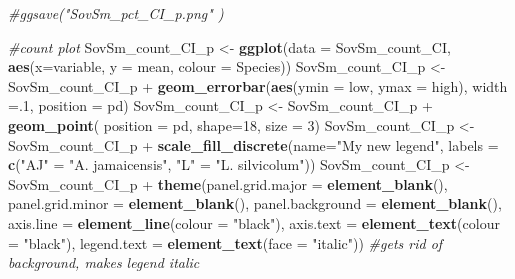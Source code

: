 \documentclass[]{article}
\newenvironment{Shaded}{\begin{snugshade}}{\end{snugshade}}
\newcommand{\KeywordTok}[1]{\textcolor[rgb]{0.13,0.29,0.53}{\textbf{{#1}}}}
\newcommand{\DataTypeTok}[1]{\textcolor[rgb]{0.13,0.29,0.53}{{#1}}}
\newcommand{\DecValTok}[1]{\textcolor[rgb]{0.00,0.00,0.81}{{#1}}}
\newcommand{\StringTok}[1]{\textcolor[rgb]{0.31,0.60,0.02}{{#1}}}
\newcommand{\CommentTok}[1]{\textcolor[rgb]{0.56,0.35,0.01}{\textit{{#1}}}}
\newcommand{\NormalTok}[1]{{#1}}
\begin{document}
\begin{Shaded}
\begin{Highlighting}[]
\CommentTok{#ggsave("SovSm_pct_CI_p.png" )}

\CommentTok{#count plot}
\NormalTok{SovSm_count_CI_p <-}\StringTok{ }\KeywordTok{ggplot}\NormalTok{(}\DataTypeTok{data =} \NormalTok{SovSm_count_CI, }\KeywordTok{aes}\NormalTok{(}\DataTypeTok{x=}\NormalTok{variable, }\DataTypeTok{y =} \NormalTok{mean, }\DataTypeTok{colour =} \NormalTok{Species))}
\NormalTok{SovSm_count_CI_p <-}\StringTok{ }\NormalTok{SovSm_count_CI_p +}\StringTok{ }\KeywordTok{geom_errorbar}\NormalTok{(}\KeywordTok{aes}\NormalTok{(}\DataTypeTok{ymin =} \NormalTok{low, }\DataTypeTok{ymax =} \NormalTok{high), }\DataTypeTok{width =}\NormalTok{.}\DecValTok{1}\NormalTok{, }\DataTypeTok{position =} \NormalTok{pd)}
\NormalTok{SovSm_count_CI_p <-}\StringTok{ }\NormalTok{SovSm_count_CI_p +}\StringTok{ }\KeywordTok{geom_point}\NormalTok{( }\DataTypeTok{position =} \NormalTok{pd, }\DataTypeTok{shape=}\DecValTok{18}\NormalTok{, }\DataTypeTok{size =} \DecValTok{3}\NormalTok{)}
\NormalTok{SovSm_count_CI_p <-}\StringTok{ }\NormalTok{SovSm_count_CI_p +}\StringTok{ }\KeywordTok{scale_fill_discrete}\NormalTok{(}\DataTypeTok{name=}\StringTok{"My new legend"}\NormalTok{, }\DataTypeTok{labels =} \KeywordTok{c}\NormalTok{(}\StringTok{"AJ"} \NormalTok{=}\StringTok{ "A. jamaicensis"}\NormalTok{, }\StringTok{"L"} \NormalTok{=}\StringTok{ "L. silvicolum"}\NormalTok{)) }
\NormalTok{SovSm_count_CI_p <-}\StringTok{ }\NormalTok{SovSm_count_CI_p +}\StringTok{ }\KeywordTok{theme}\NormalTok{(}\DataTypeTok{panel.grid.major =} \KeywordTok{element_blank}\NormalTok{(), }\DataTypeTok{panel.grid.minor =} \KeywordTok{element_blank}\NormalTok{(),}
\DataTypeTok{panel.background =} \KeywordTok{element_blank}\NormalTok{(), }\DataTypeTok{axis.line =} \KeywordTok{element_line}\NormalTok{(}\DataTypeTok{colour =} \StringTok{"black"}\NormalTok{), }\DataTypeTok{axis.text =} \KeywordTok{element_text}\NormalTok{(}\DataTypeTok{colour =} \StringTok{"black"}\NormalTok{), }\DataTypeTok{legend.text =} \KeywordTok{element_text}\NormalTok{(}\DataTypeTok{face =} \StringTok{"italic"}\NormalTok{))  }\CommentTok{#gets rid of background, makes legend italic}


\end{Highlighting}
\end{Shaded}
\end{document}
